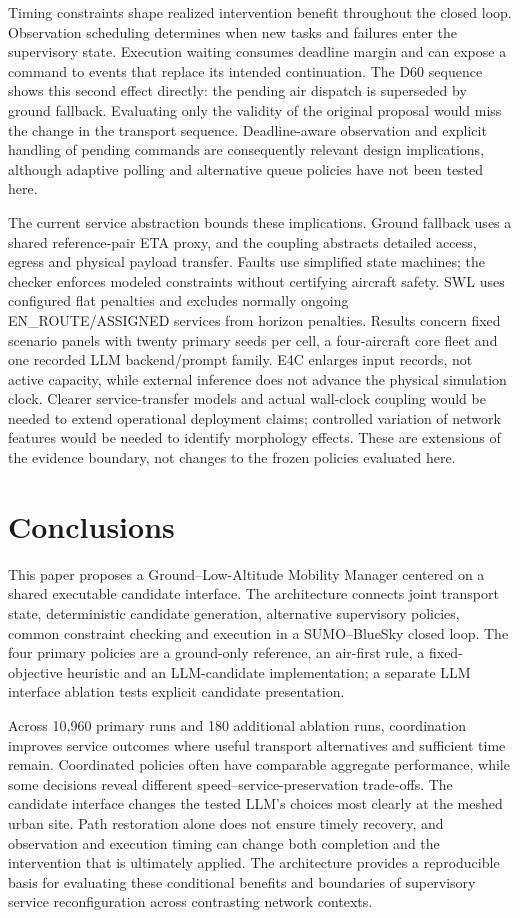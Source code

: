 \documentclass[]{interact}
\theoremstyle{plain}
\theoremstyle{definition}
\theoremstyle{remark}
\begin{document}
Timing constraints shape realized intervention benefit throughout the closed loop. Observation scheduling determines when new tasks and failures enter the supervisory state. Execution waiting consumes deadline margin and can expose a command to events that replace its intended continuation. The D60 sequence shows this second effect directly: the pending air dispatch is superseded by ground fallback. Evaluating only the validity of the original proposal would miss the change in the transport sequence. Deadline-aware observation and explicit handling of pending commands are consequently relevant design implications, although adaptive polling and alternative queue policies have not been tested here.

The current service abstraction bounds these implications. Ground fallback uses a shared reference-pair ETA proxy, and the coupling abstracts detailed access, egress and physical payload transfer. Faults use simplified state machines; the checker enforces modeled constraints without certifying aircraft safety. SWL uses configured flat penalties and excludes normally ongoing EN\_ROUTE/ASSIGNED services from horizon penalties. Results concern fixed scenario panels with twenty primary seeds per cell, a four-aircraft core fleet and one recorded LLM backend/prompt family. E4C enlarges input records, not active capacity, while external inference does not advance the physical simulation clock. Clearer service-transfer models and actual wall-clock coupling would be needed to extend operational deployment claims; controlled variation of network features would be needed to identify morphology effects. These are extensions of the evidence boundary, not changes to the frozen policies evaluated here.

\section{Conclusions}

This paper proposes a Ground--Low-Altitude Mobility Manager centered on a shared executable candidate interface. The architecture connects joint transport state, deterministic candidate generation, alternative supervisory policies, common constraint checking and execution in a SUMO--BlueSky closed loop. The four primary policies are a ground-only reference, an air-first rule, a fixed-objective heuristic and an LLM-candidate implementation; a separate LLM interface ablation tests explicit candidate presentation.

Across 10,960 primary runs and 180 additional ablation runs, coordination improves service outcomes where useful transport alternatives and sufficient time remain. Coordinated policies often have comparable aggregate performance, while some decisions reveal different speed--service-preservation trade-offs. The candidate interface changes the tested LLM's choices most clearly at the meshed urban site. Path restoration alone does not ensure timely recovery, and observation and execution timing can change both completion and the intervention that is ultimately applied. The architecture provides a reproducible basis for evaluating these conditional benefits and boundaries of supervisory service reconfiguration across contrasting network contexts.
\end{document}
